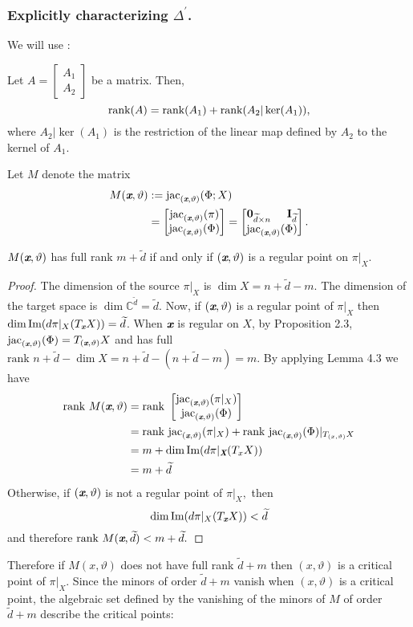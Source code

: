 \documentclass[sigconf]{acmart}
\def\Xb{\textit{\textbf{X}}}
\def\xb{\textit{\textbf{x}}}
\def\C{\mathbb{C}}
\def\vt{\vartheta}
\def\jac{ \textrm{jac}}
\def\rank{\textrm{rank}}
\def\dt{\widetilde{d}}
\def\rk{\textrm{rank }}
\def\bbm{\begin{bmatrix}}
\def\ebm{\end{bmatrix}}
\begin{document}
\subsubsection{Explicitly characterizing $\Delta^{'}$.} 
We will use \cite[Lemma B.4]{NO}:
\begin{lemma}
Let $A=\bbm A_1 \\ A_2 \ebm$ be a matrix. Then, 
\[ 
\textup{rank}(A) = 
\textup{rank}(A_1) + \textup{rank}(A_2|\ker(A_1)),
\]
where $A_2|\ker(A_1)$ is the restriction of the linear map defined by $A_2$ to the kernel of $A_1$. 
\end{lemma}
Let $M$ denote the matrix
\begin{align*}M(\xb,\vt)&:= \jac_{(\xb,\vt)}(\Phi;X)\\
&= 
\bbm 
\jac_{(\xb,\vt)}(\pi)\\
\jac_{(\xb,\vt)}(\Phi) 
\ebm 
=
\bbm 
\textbf{0}_{\dt \times n}\hspace{5mm}\textbf{I}_{\dt} \\
\jac_{(\xb,\vt)}(\Phi)
\ebm.\end{align*}
%
%
\begin{proposition} 
$M(\xb,\vt)$ has full rank $m+\dt$ if and only if $(\xb,\vt)$ is a regular point on $\pi|_X.$ 
\end{proposition}
\begin{proof}
The dimension of the source $\pi|_X$ is $\dim X = n + \dt - m.$ The dimension of the target space is $\dim \C^{\dt} = \dt.$ Now, if $(\xb,\vt)$ is a regular point of $\pi|_{X}$ then $\dim \textrm{Im}(d\pi|_X(T_{\xb}X)) = \dt$. When $\xb$ is regular on $X$, by Proposition 2.3, $\jac_{(\xb,\vt)} (\Phi) = T_{(\xb,\vt)}X$ and has full $\rk n + \dt - \dim X = n + \dt - (n + \dt - m) = m$. By applying Lemma 4.3 we have
\begin{align*}
\rank ~M(\xb,\vartheta) &= 
\rank ~
\bbm 
\jac_{(\xb,\vartheta)}(\pi|_X)\\
\jac_{(\xb,\vartheta)}(\Phi) 
\ebm \\
&= \rank~ \jac_{(\xb,\vartheta)}(\pi|_X) + \rank ~\jac_{(\xb,\vartheta)}(\Phi)|_{T_{(x,\vartheta)}X} \\
&= m + \dim \textrm{Im}(d\pi|_{\Xb}(T_xX)) \\
&= m + \dt 
\end{align*}
Otherwise, if $(\xb,\vt)$ is not a regular point of $\pi|_X,$ then \[\dim \textrm{Im}(d\pi|_X(T_{\xb}X)) < \dt\]  and therefore $\rank ~M(\xb,\dt) < m+\dt.$ 
\end{proof}
%
Therefore if $M(x,\vt)$ does not have full rank $\dt+m$ then $(x,\vt)$ is a critical point of $\pi|_X$. Since the minors of order $\dt+m$ vanish when $(x,\vt)$ is a critical point, the algebraic set defined by the vanishing of the minors of $M$ of order $\dt + m$ describe the critical points:
\end{document}
